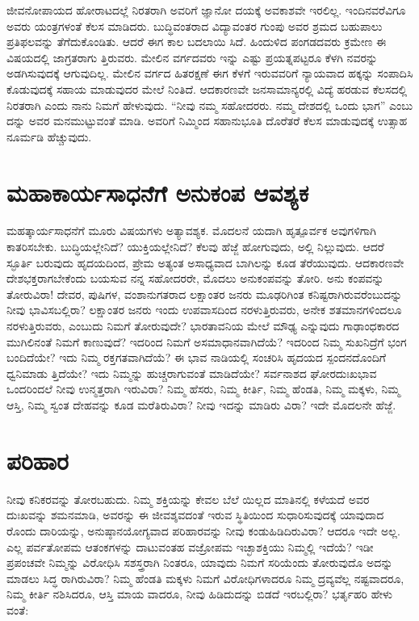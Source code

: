 ಜೀವನೋಪಾಯದ ಹೋರಾಟದಲ್ಲೆ ನಿರತರಾಗಿ ಅವರಿಗೆ ಜ್ಞಾನೋ ದಯಕ್ಕೆ ಅವಕಾಶವೇ ಇರಲಿಲ್ಲ. ಇಂದಿನವರೆವಿಗೂ ಅವರು ಯಂತ್ರಗಳಂತೆ ಕೆಲಸ ಮಾಡಿದರು. ಬುದ್ಧಿವಂತರಾದ ವಿದ್ಯಾವಂತರ ಗುಂಪು ಅವರ ಶ್ರಮದ ಬಹುಪಾಲು ಪ್ರತಿಫಲವನ್ನು ತೆಗೆದುಕೊಂಡಿತು. ಆದರೆ ಈಗ ಕಾಲ ಬದಲಾಯಿ ಸಿದೆ. ಹಿಂದುಳಿದ ಪಂಗಡದವರು ಕ್ರಮೇಣ ಈ ವಿಷಯದಲ್ಲಿ ಜಾಗ್ರತರಾಗು ತ್ತಿರುವರು. ಮೇಲಿನ ವರ್ಗದವರು ಇನ್ನು ಎಷ್ಟು ಪ್ರಯತ್ನಪಟ್ಟರೂ ಕೆಳಗಿ ನವರನ್ನು ಅಡಗಿಸುವುದಕ್ಕೆ ಆಗುವುದಿಲ್ಲ. ಮೇಲಿನ ವರ್ಗದ ಹಿತರಕ್ಷಣೆ ಈಗ ಕೆಳಗೆ ಇರುವವರಿಗೆ ನ್ಯಾಯವಾದ ಹಕ್ಕನ್ನು ಸಂಪಾದಿಸಿ ಕೊಡುವುದಕ್ಕೆ ಸಹಾಯ ಮಾಡುವುದರ ಮೇಲೆ ನಿಂತಿದೆ. ಆದಕಾರಣವೇ ಜನಸಾಮಾನ್ಯರಲ್ಲಿ ವಿದ್ಯೆ ಹರಡುವ ಕೆಲಸದಲ್ಲಿ ನಿರತರಾಗಿ ಎಂದು ನಾನು ನಿಮಗೆ ಹೇಳುವುದು. “ನೀವು ನಮ್ಮ ಸಹೋದರರು. ನಮ್ಮ ದೇಶದಲ್ಲಿ ಒಂದು ಭಾಗ” ಎಂಬು ದನ್ನು ಅವರ ಮನಮುಟ್ಟುವಂತೆ ಮಾಡಿ. ಅವರಿಗೆ ನಿಮ್ಮಿಂದ ಸಹಾನುಭೂತಿ ದೊರೆತರೆ ಕೆಲಸ ಮಾಡುವುದಕ್ಕೆ ಉತ್ಸಾಹ ನೂರ್ಮಡಿ ಹೆಚ್ಚುವುದು.


\section{ಮಹಾಕಾರ್ಯಸಾಧನೆಗೆ ಅನುಕಂಪ ಆವಶ್ಯಕ}

ಮಹತ್ಕಾರ್ಯಸಾಧನೆಗೆ ಮೂರು ವಿಷಯಗಳು ಅತ್ಯಾವಶ್ಯಕ. ಮೊದಲನೆ ಯದಾಗಿ ಹೃತ್ಪೂರ್ವಕ ಅವುಗಳಿಗಾಗಿ ಕಾತರಿಸಬೇಕು. ಬುದ್ಧಿಯಲ್ಲೇನಿದೆ? ಯುಕ್ತಿಯಲ್ಲೇನಿದೆ? ಕೆಲವು ಹೆಜ್ಜೆ ಹೋಗುವುದು, ಅಲ್ಲಿ ನಿಲ್ಲುವುದು. ಆದರೆ ಸ್ಫೂರ್ತಿ ಬರುವುದು ಹೃದಯದಿಂದ, ಪ್ರೇಮ ಅತ್ಯಂತ ಅಸಾಧ್ಯವಾದ ಬಾಗಿಲನ್ನು ಕೂಡ ತೆರೆಯುವುದು. ಆದಕಾರಣವೇ ದೇಶಭಕ್ತರಾಗಬೇಕೆಂದು ಬಯಸುವ ನನ್ನ ಸಹೋದರರೇ, ಮೊದಲು ಅನುಕಂಪವನ್ನು ತೋರಿ. ಅನು ಕಂಪವನ್ನು ತೋರುವಿರಾ! ದೇವರ, ಪುಷಿಗಳ, ವಂಶಾನುಗತರಾದ ಲಕ್ಷಾಂತರ ಜನರು ಮೂಢರಿಗಿಂತ ಕನಿಷ್ಟರಾಗಿರುವರೆಂಬುದನ್ನು ನೀವು ಭಾವಿಸಬಲ್ಲಿರಾ? ಲಕ್ಷಾಂತರ ಜನರು ಇಂದು ಉಪವಾಸದಿಂದ ನರಳುತ್ತಿರುವರು, ಅನೇಕ ಶತಮಾನಗಳಿಂದಲೂ ನರಳುತ್ತಿರುವರು, ಎಂಬುದು ನಿಮಗೆ ತೋರುವುದೇ? ಭಾರತಾವನಿಯ ಮೇಲೆ ಮೌಢ್ಯ ಎನ್ನುವುದು ಗಾಢಾಂಧಕಾರದ ಮುಗಿಲಿನಂತೆ ನಿಮಗೆ ಕಾಣುವುದೆ? ಇದರಿಂದ ನಿಮಗೆ ಅಸಮಾಧಾನವಾಗಿದೆಯೆ? ಇದರಿಂದ ನಿಮ್ಮ ಸುಖನಿದ್ರೆಗೆ ಭಂಗ ಬಂದಿದೆಯೇ? ಇದು ನಿಮ್ಮ ರಕ್ತಗತವಾಗಿದೆಯೆ? ಈ ಭಾವ ನಾಡಿಯಲ್ಲಿ ಸಂಚರಿಸಿ ಹೃದಯದ ಸ್ಪಂದನದೊಂದಿಗೆ ಧ್ವನಿಮಾಡು ತ್ತಿದೆಯೇ? ಇದು ನಿಮ್ಮನ್ನು ಹುಚ್ಚರಾಗುವಂತೆ ಮಾಡಿದೆಯೇ? ಸರ್ವನಾಶದ ಘೋರದುಃಖಭಾವ ಒಂದರಿಂದಲೆ ನೀವು ಉನ್ಮತ್ತರಾಗಿ ಇರುವಿರಾ? ನಿಮ್ಮ ಹೆಸರು, ನಿಮ್ಮ ಕೀರ್ತಿ, ನಿಮ್ಮ ಹೆಂಡತಿ, ನಿಮ್ಮ ಮಕ್ಕಳು, ನಿಮ್ಮ ಆಸ್ತಿ, ನಿಮ್ಮ ಸ್ವಂತ ದೇಹವನ್ನು ಕೂಡ ಮರೆತಿರುವಿರಾ? ನೀವು ಇದನ್ನು ಮಾಡಿರು ವಿರಾ? ಇದೇ ಮೊದಲನೇ ಹೆಜ್ಜೆ.


\section{ಪರಿಹಾರ}

ನೀವು ಕನಿಕರವನ್ನು ತೋರಬಹುದು. ನಿಮ್ಮ ಶಕ್ತಿಯನ್ನು ಕೇವಲ ಬೆಲೆ ಯಿಲ್ಲದ ಮಾತಿನಲ್ಲಿ ಕಳೆಯದೆ ಅವರ ದುಃಖವನ್ನು ಶಮನಮಾಡಿ, ಅವರನ್ನು ಈ ಜೀವಶ್ಶವದಂತೆ ಇರುವ ಸ್ಥಿತಿಯಿಂದ ಸುಧಾರಿಸುವುದಕ್ಕೆ ಯಾವುದಾದ ರೊಂದು ದಾರಿಯನ್ನು, ಅನುಷ್ಠಾನಯೋಗ್ಯವಾದ ಪರಿಹಾರವನ್ನು ನೀವು ಕಂಡುಹಿಡಿದಿರುವಿರಾ? ಆದರೂ ಇದೇ ಅಲ್ಲ. ಎಲ್ಲ ಪರ್ವತೋಪಮ ಆತಂಕಗಳನ್ನು ದಾಟುವಂತಹ ವಜ್ರೋಪಮ ಇಚ್ಛಾಶಕ್ತಿಯು ನಿಮ್ಮಲ್ಲಿ ಇದೆಯೆ? ಇಡೀ ಪ್ರಪಂಚವೇ ನಿಮ್ಮನ್ನು ವಿರೋಧಿಸಿ ಸಶಸ್ತ್ರರಾಗಿ ನಿಂತರೂ, ಯಾವುದು ನಿಮಗೆ ಸರಿಯೆಂದು ತೋರುವುದೊ ಅದನ್ನು ಮಾಡಲು ಸಿದ್ಧ ರಾಗಿರುವಿರಾ? ನಿಮ್ಮ ಹೆಂಡತಿ ಮಕ್ಕಳು ನಿಮಗೆ ವಿರೋಧಿಗಳಾದರೂ ನಿಮ್ಮ ದ್ರವ್ಯವೆಲ್ಲ ನಷ್ಟವಾದರೂ, ನಿಮ್ಮ ಕೀರ್ತಿ ನಶಿಸಿದರೂ, ಆಸ್ತಿ ಮಾಯ ವಾದರೂ, ನೀವು ಹಿಡಿದುದನ್ನು ಬಿಡದೆ ಇರಬಲ್ಲಿರಾ? ಭರ್ತೃಹರಿ ಹೇಳು ವಂತೆ:

